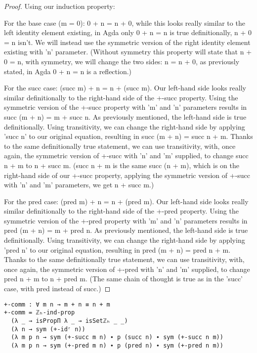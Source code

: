 \begin{proof}
  Using our induction property:

  For the base case (m = 0): 0 + n = n + 0, while this looks really similar to the left identity element existing, in Agda only 0 + n = n is true definitionally, n + 0 = n isn't. We will instead use the symmetric version of the right identity element existing with 'n' parameter. (Without symmetry this property will state that n + 0 = n, with symmetry, we will change the two sides: n = n + 0, as previously stated, in Agda 0 + n = n is a reflection.)

  For the succ case: (succ m) + n = n + (succ m). Our left-hand side looks really similar definitionally to the right-hand side of the +-succ property. Using the symmetric version of the +-succ property with 'm' and 'n' parameters results in succ (m + n) = m + succ n. As previously mentioned, the left-hand side is true definitionally. Using transitivity, we can change the right-hand side by applying 'succ n' to our original equation, resulting in succ (m + n) = succ n + m. Thanks to the same definitionally true statement, we can use transitivity, with, once again, the symmetric version of +-succ with 'n' and 'm' supplied, to change succ n + m to n + succ m. (succ n + m is the same succ (n + m), which is on the right-hand side of our +-succ property, applying the symmetric version of +-succ with 'n' and 'm' parameters, we get n + succ m.)

  For the pred case: (pred m) + n = n + (pred m). Our left-hand side looks really similar definitionally to the right-hand side of the +-pred property. Using the symmetric version of the +-pred property with 'm' and 'n' parameters results in pred (m + n) = m + pred n. As previously mentioned, the left-hand side is true definitionally. Using transitivity, we can change the right-hand side by applying 'pred n' to our original equation, resulting in pred (m + n) = pred n + m. Thanks to the same definitionally true statement, we can use transitivity, with, once again, the symmetric version of +-pred with 'n' and 'm' supplied, to change pred n + m to n + pred m. (The same chain of thought is true as in the 'succ' case, with pred instead of succ.)
\end{proof}

\begin{listing}[H]
\begin{verbatim}
+-comm : ∀ m n → m + n ≡ n + m
+-comm = ℤₕ-ind-prop
  (λ _ → isPropΠ λ _ → isSetℤₕ _ _)
  (λ n → sym (+-idʳ n))
  (λ m p n → sym (+-succ m n) ∙ p (succ n) ∙ sym (+-succ n m))
  (λ m p n → sym (+-pred m n) ∙ p (pred n) ∙ sym (+-pred n m))
\end{verbatim}
\caption{Agda proof of addition being commutative}
\end{listing}
